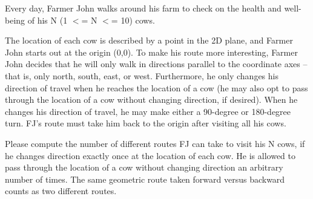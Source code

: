 Every day, Farmer John walks around his farm to check on the health and well-being of his N (1 $<$= N $<$= 10) cows. 

The location of each cow is described by a point in the 2D plane, and Farmer John starts out at the origin (0,0).  To make his route more interesting, Farmer John decides that he will only walk in directions parallel to the coordinate axes -- that is, only north, south, east, or west.  Furthermore, he only changes his direction of travel when he reaches the location of a cow (he may also opt to pass through the location of a cow without changing direction, if desired).  When he changes his direction of travel, he may make either a 90-degree or 180-degree turn.  FJ's route must take him back to the origin after visiting all his cows.

Please compute the number of different routes FJ can take to visit his N cows, if he changes direction exactly once at the location of each cow.  He is allowed to pass through the location of a cow without changing direction an arbitrary number of times.  The same geometric route taken forward versus backward counts as two different routes.